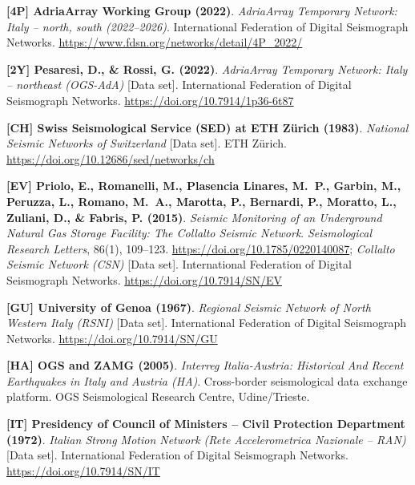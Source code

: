 \begin{enumerate}[label={[\textbf{\arabic*}]},leftmargin=*]
  \item \textbf{[4P] AdriaArray Working Group (2022)}. 
  \textit{AdriaArray Temporary Network: Italy -- north, south (2022--2026)}. 
  International Federation of Digital Seismograph Networks. 
  \url{https://www.fdsn.org/networks/detail/4P_2022/}

  \item \textbf{[2Y] Pesaresi, D., \& Rossi, G. (2022)}. 
  \textit{AdriaArray Temporary Network: Italy -- northeast (OGS-AdA)} [Data set]. 
  International Federation of Digital Seismograph Networks. 
  \url{https://doi.org/10.7914/1p36-6t87}

  \item \textbf{[CH] Swiss Seismological Service (SED) at ETH Z\"urich (1983)}. 
  \textit{National Seismic Networks of Switzerland} [Data set]. 
  ETH Z\"urich. 
  \url{https://doi.org/10.12686/sed/networks/ch}

  \item \textbf{[EV] Priolo, E., Romanelli, M., Plasencia Linares, M.~P., Garbin, M., Peruzza, L., Romano, M.~A., Marotta, P., Bernardi, P., Moratto, L., Zuliani, D., \& Fabris, P. (2015)}. 
  \textit{Seismic Monitoring of an Underground Natural Gas Storage Facility: The Collalto Seismic Network}. 
  \textit{Seismological Research Letters}, 86(1), 109--123. 
  \url{https://doi.org/10.1785/0220140087}; 
  \textit{Collalto Seismic Network (CSN)} [Data set]. International Federation of Digital Seismograph Networks. 
  \url{https://doi.org/10.7914/SN/EV}

  \item \textbf{[GU] University of Genoa (1967)}. 
  \textit{Regional Seismic Network of North Western Italy (RSNI)} [Data set]. 
  International Federation of Digital Seismograph Networks. 
  \url{https://doi.org/10.7914/SN/GU}

  \item \textbf{[HA] OGS and ZAMG (2005)}. 
  \textit{Interreg Italia-Austria: Historical And Recent Earthquakes in Italy and Austria (HA)}. 
  Cross-border seismological data exchange platform. 
  OGS Seismological Research Centre, Udine/Trieste.

  \item \textbf{[IT] Presidency of Council of Ministers -- Civil Protection Department (1972)}. 
  \textit{Italian Strong Motion Network (Rete Accelerometrica Nazionale -- RAN)} [Data set]. 
  International Federation of Digital Seismograph Networks. 
  \url{https://doi.org/10.7914/SN/IT}


\end{enumerate}
